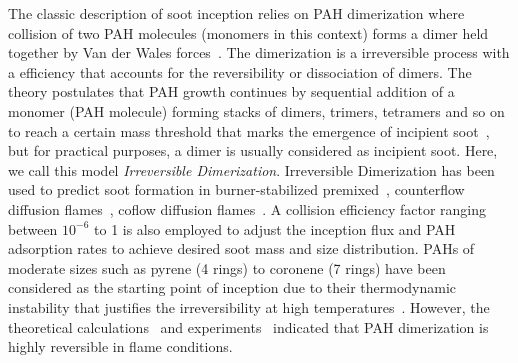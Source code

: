 The classic description of soot inception relies on PAH dimerization where collision of two PAH molecules (monomers in this context) forms a dimer held together by Van der Wales forces~\citep{frenklach1991detailed}. The dimerization is a irreversible process with a efficiency that accounts for the reversibility or dissociation of dimers. The theory postulates that PAH growth continues by sequential addition of a monomer (PAH molecule) forming stacks of dimers, trimers, tetramers and so on to reach a certain mass threshold that marks the emergence of incipient soot~\citep{frenklach1991detailed}, but for practical purposes, a dimer is usually considered as incipient soot. Here, we call this model \textit{Irreversible Dimerization}. 
Irreversible Dimerization has been used to predict soot formation in burner-stabilized premixed~\citep{salenbauch2015modeling, desgroux2017comparative}, counterflow diffusion flames~\citep{wang2015soot, xu2021experimental}, coflow diffusion flames~\citep{kholghy2016core, veshkini2016understanding}. A collision efficiency factor ranging between $10^{-6}$ to 1 is also employed to adjust the inception flux and PAH adsorption rates to achieve desired soot mass and size distribution. PAHs of moderate sizes such as pyrene (4 rings) to coronene (7 rings) have been considered as the starting point of inception due to their thermodynamic instability that justifies the irreversibility at high temperatures~\citep{frenklach1991detailed}. However, the theoretical calculations~\citep{miller1985calculations} and experiments~\citep{sabbah2010exploring} indicated that PAH dimerization is highly reversible in flame conditions.







